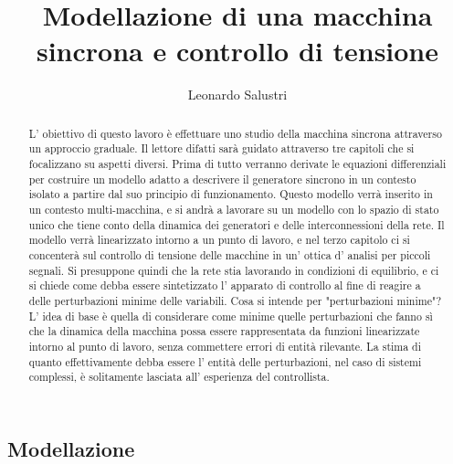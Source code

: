 \documentclass[Lau,noexaminfo]{sapthesis}
\title{Modellazione di una macchina sincrona e controllo di tensione}
\author{Leonardo Salustri}
\begin{document}
	\frontmatter
	
	
	\maketitle
	\begin{abstract}
		L' obiettivo di questo lavoro è effettuare uno studio della macchina sincrona attraverso un approccio graduale. Il lettore difatti sarà guidato attraverso tre capitoli che si focalizzano su aspetti diversi. Prima di tutto verranno derivate le equazioni differenziali per costruire un modello adatto a descrivere il generatore sincrono in un contesto isolato a partire dal suo principio di funzionamento. Questo modello verrà inserito in un contesto multi-macchina, e si andrà a lavorare su un modello con lo spazio di stato unico che tiene conto della dinamica dei generatori e delle interconnessioni della rete. Il modello verrà linearizzato intorno a un punto di lavoro, e nel terzo capitolo ci si concenterà sul controllo di tensione delle macchine in un' ottica d' analisi per piccoli segnali. Si presuppone quindi che la rete stia lavorando in condizioni di equilibrio, e ci si chiede come debba essere sintetizzato l' apparato di controllo al fine di reagire a delle perturbazioni minime delle variabili. Cosa si intende per "perturbazioni minime"? L' idea di base è quella di considerare come minime quelle perturbazioni che fanno sì che la dinamica della macchina possa essere rappresentata da funzioni linearizzate intorno al punto di lavoro, senza commettere errori di entità rilevante. La stima di quanto effettivamente debba essere l' entità delle perturbazioni, nel caso di sistemi complessi, è solitamente lasciata all' esperienza del controllista.
	\end{abstract}
	\tableofcontents
	
	\setcounter{secnumdepth}{1}
	\setcounter{tocdepth}{1}
	\mainmatter
	\chapter{}
	\section{Modellazione}
\end{document}
